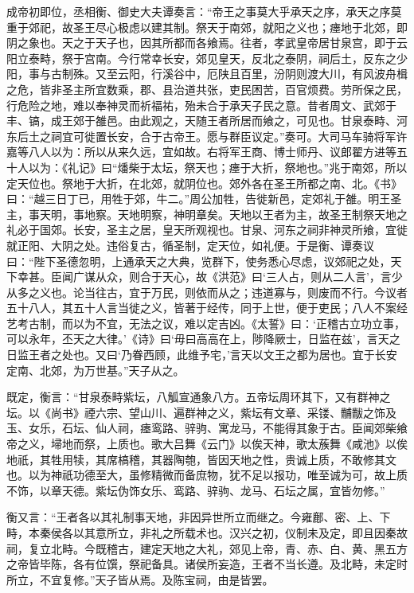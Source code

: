 \documentclass[12pt,UTF8]{ctexbook}
\begin{document}
成帝初即位，丞相衡、御史大夫谭奏言：“帝王之事莫大乎承天之序，承天之序莫重于郊祀，故圣王尽心极虑以建其制。祭天于南郊，就阳之义也；瘗地于北郊，即阴之象也。天之于天子也，因其所都而各飨焉。往者，孝武皇帝居甘泉宫，即于云阳立泰畤，祭于宫南。今行常幸长安，郊见皇天，反北之泰阴，祠后土，反东之少阳，事与古制殊。又至云阳，行溪谷中，厄陕且百里，汾阴则渡大川，有风波舟楫之危，皆非圣主所宜数乘，郡、县治道共张，吏民困苦，百官烦费。劳所保之民，行危险之地，难以奉神灵而祈福祐，殆未合于承天子民之意。昔者周文、武郊于丰、镐，成王郊于雒邑。由此观之，天随王者所居而飨之，可见也。甘泉泰畤、河东后土之祠宜可徙置长安，合于古帝王。愿与群臣议定。”奏可。大司马车骑将军许嘉等八人以为：所以从来久远，宜如故。右将军王商、博士师丹、议郎翟方进等五十人以为：《礼记》曰“燔柴于太坛，祭天也；瘗于大折，祭地也。”兆于南郊，所以定天位也。祭地于大折，在北郊，就阴位也。郊外各在圣王所都之南、北。《书》曰：“越三日丁已，用牲于郊，牛二。”周公加牲，告徙新邑，定郊礼于雒。明王圣主，事天明，事地察。天地明察，神明章矣。天地以王者为主，故圣王制祭天地之礼必于国郊。长安，圣主之居，皇天所观视也。甘泉、河东之祠非神灵所飨，宜徙就正阳、大阴之处。违俗复古，循圣制，定天位，如礼便。于是衡、谭奏议曰：“陛下圣德忽明，上通承天之大典，览群下，使务悉心尽虑，议郊祀之处，天下幸甚。臣闻广谋从众，则合于天心，故《洪范》曰‘三人占，则从二人言’，言少从多之义也。论当往古，宜于万民，则依而从之；违道寡与，则废而不行。今议者五十八人，其五十人言当徙之义，皆著于经传，同于上世，便于吏民；八人不案经艺考古制，而以为不宜，无法之议，难以定吉凶。《太誓》曰：‘正稽古立功立事，可以永年，丕天之大律。’《诗》曰‘毋曰高高在上，陟降厥士，日监在兹’，言天之日监王者之处也。又曰‘乃眷西顾，此维予宅，’言天以文王之都为居也。宜于长安定南、北郊，为万世基。”天子从之。



既定，衡言：“甘泉泰畤紫坛，八觚宣通象八方。五帝坛周环其下，又有群神之坛。以《尚书》禋六宗、望山川、遍群神之义，紫坛有文章、采镂、黼黻之饰及玉、女乐，石坛、仙人祠，瘗鸾路、骍驹、寓龙马，不能得其象于古。臣闻郊柴飨帝之义，埽地而祭，上质也。歌大吕舞《云门》以俟天神，歌太蔟舞《咸池》以俟地祇，其牲用犊，其席槁稽，其器陶匏，皆因天地之性，贵诚上质，不敢修其文也。以为神祇功德至大，虽修精微而备庶物，犹不足以报功，唯至诚为可，故上质不饰，以章天德。紫坛伪饰女乐、鸾路、骍驹、龙马、石坛之属，宜皆勿修。”



衡又言：“王者各以其礼制事天地，非因异世所立而继之。今雍鄜、密、上、下畤，本秦侯各以其意所立，非礼之所载术也。汉兴之初，仪制未及定，即且因秦故祠，复立北畤。今既稽古，建定天地之大礼，郊见上帝，青、赤、白、黄、黑五方之帝皆毕陈，各有位馔，祭祀备具。诸侯所妄造，王者不当长遵。及北畤，未定时所立，不宜复修。”天子皆从焉。及陈宝祠，由是皆罢。
\end{document}
